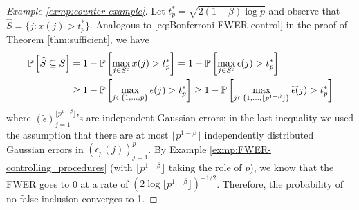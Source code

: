 \begin{proof}[Example \ref{exmp:counter-example}]
Let $t_p^* = \sqrt{2(1-\beta)\log{p}}$  and observe that $\widehat{S} = \{j:x(j)>t_p^*\}$.
Analogous to \eqref{eq:Bonferroni-FWER-control} in the proof of Theorem \ref{thm:sufficient}, we have
\begin{align*}
    \P\left[\widehat{S} \subseteq S\right] 
        &= 1 - \P\left[\max_{j\in S^c}x(j) > t_p^*\right] 
        = 1 - \P\left[\max_{j\in S^c}\epsilon(j) > t_p^*\right] \nonumber \\
        &\ge 1 - \P\left[\max_{j\in\{1,\ldots,p\}}\epsilon(j) > t_p^*\right] 
        \ge 1 - \P\left[\max_{j\in\{1,\ldots,\lfloor p^{1-\beta}\rfloor\}}\widetilde{\epsilon}(j) > t_p^*\right]
\end{align*}
where $\left(\widetilde{\epsilon}\right)_{j=1}^{\lfloor p^{1-\beta}\rfloor}$'s are independent Gaussian errors; in the last inequality we used the assumption that there are at most $\lfloor p^{1-\beta}\rfloor$ independently distributed Gaussian errors in $\left(\epsilon_p(j)\right)_{j=1}^p$.
By Example \ref{exmp:FWER-controlling_procedures} (with $\lfloor p^{1-\beta}\rfloor$ taking the role of $p$), we know that the FWER goes to 0 at a rate of 
$\left(2\log{\lfloor p^{1-\beta}\rfloor}\right)^{-1/2}$.
Therefore, the probability of no false inclusion converges to 1.



\end{proof}
